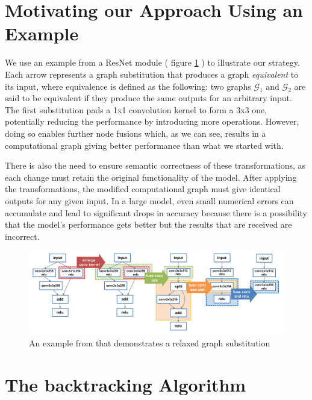 \documentclass[12pt,a4paper,twoside,openright,bibliography=totocnumbered]{report}
\begin{document}
\section{Motivating our Approach Using an Example}
We use an example from a ResNet \cite{he2016} module ( figure \ref{resnet} ) to illustrate our strategy. Each arrow represents a graph substitution that produces a graph \textit{equivalent} to its input, where equivalence is defined as the following: two graphs $\mathcal{G}_1$ and $\mathcal{G}_2$ are said to be equivalent if they produce the same outputs for an arbitrary input. The first substitution pads a 1x1 convolution kernel to form a 3x3 one, potentially reducing the performance by introducing more operations. However, doing so enables further node fusions which, as we can see, results in a computational graph giving better performance than what we started with. 

There is also the need to ensure semantic correctness of these transformations, as each change must retain the original functionality of the model. After applying the transformations, the modified computational graph must give identical outputs for any given input. In a large model, even small numerical errors can accumulate and lead to significant drops in accuracy because there is a possibility that the model's performance gets better but the results that are received are incorrect. \\

\begin{figure}[ht!]
	\begin{center}
		\includegraphics[scale=0.4]{resnetExample}
	\end{center}	
	\caption{An example from \cite{jia2019} that demonstrates a relaxed graph substitution}
	\label{resnet}
\end{figure}

\section{The backtracking Algorithm} \label{backtracking}
\end{document}
